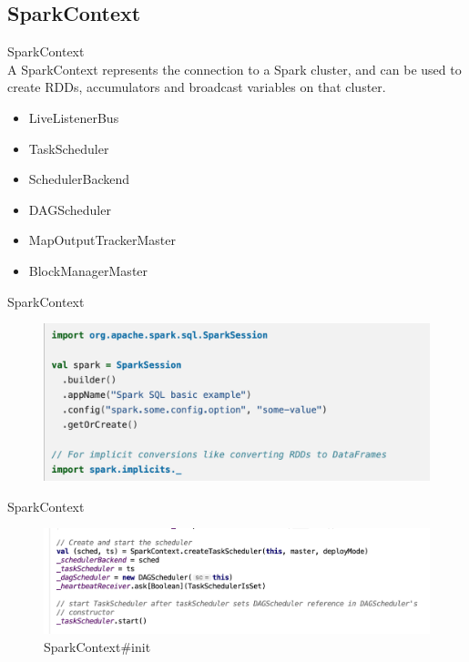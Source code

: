 \subsection{SparkContext}
\begin{frame}[plain,t]{SparkContext} %
	 \\  \vspace{2ex}
	A SparkContext represents the connection to a Spark
	 cluster, and can be used to create RDDs, accumulators and broadcast variables on that cluster.
	 
	 \vspace{2ex}
	 
	 \begin{itemize}
	 	\item LiveListenerBus
	 	\item TaskScheduler
	 	\item SchedulerBackend
	 	\item DAGScheduler
	 	\item MapOutputTrackerMaster
	 	\item BlockManagerMaster
	 \end{itemize}
\end{frame}
\begin{frame}[plain,t]{SparkContext} %
	 \\  \vspace{2ex}
	\begin{figure}
		\centering
		\includegraphics[width=0.9\linewidth]{images/app018}
		\label{fig:app018}
	\end{figure}
	
	
\end{frame}
\begin{frame}[plain,t]{SparkContext} %
	 \\  \vspace{2ex}
	\begin{figure}
		\centering
		\includegraphics[width=0.9\linewidth]{images/init002}
		\caption{SparkContext\#init}
		\label{fig:init002}
	\end{figure}
	
\end{frame}


